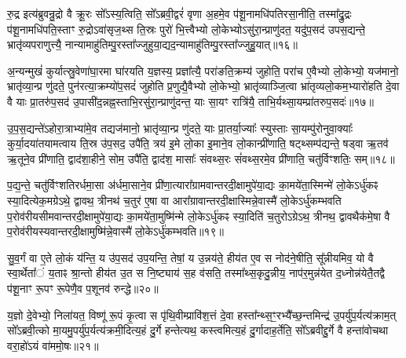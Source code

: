 रु॒द्र इत्य॑ब्रुवन्रु॒द्रो वै क्रू॒रः सो᳚\-ऽस्य॒त्विति॒ सो᳚\-ऽब्रवी॒द्वरं॑ वृणा अ॒हमे॒व प॑शू॒नामधि॑पतिरसा॒नीति॒ तस्मा᳚द्रु॒द्रः प॑शू॒नामधि॑पति॒स्ताꣳ रु॒द्रो\-ऽवा॑सृज॒थ्स ति॒स्रः पुरो॑ भि॒त्त्वैभ्यो लो॒केभ्यो\-ऽसु॑रा॒न्प्राणु॑दत॒ यदु॑प॒सद॑ उपस॒द्यन्ते॒ भ्रातृ॑व्यपराणुत्त्यै॒ नान्यामाहु॑तिम्पु॒रस्ता᳚ज्जुहुया॒द्यद॒न्यामाहु॑तिम्पु॒रस्ता᳚ज्जुहु॒यात्॥१६॥

अ॒न्यन्मुखं॑ कुर्यात्स्रु॒वेणा॑घा॒रमा घा॑रयति य॒ज्ञस्य॒ प्रज्ञा᳚त्यै॒ परा॑ङति॒क्रम्य॑ जुहोति॒ परा॑च ए॒वैभ्यो लो॒केभ्यो॒ यज॑मानो॒ भ्रातृ॑व्या॒न्प्र णु॑दते॒ पुन॑रत्या॒क्रम्यो॑प॒सदं॑ जुहोति प्र॒णुद्यै॒वैभ्यो लो॒केभ्यो॒ भ्रातृ॑व्याञ्जि॒त्वा भ्रा॑तृव्यलो॒कम॒भ्यारो॑हति दे॒वा वै याः प्रा॒तरु॑प॒सद॑ उ॒पासी॑द॒न्नह्न॒स्ताभि॒रसु॑रा॒न्प्राणु॑दन्त॒ याः सा॒यꣳ रात्रि॑यै॒ ताभि॒र्यथ्सा॒यम्प्रा॑तरुप॒सदः॑॥१७॥

उ॒प॒स॒द्यन्ते॑\-ऽहोरा॒त्राभ्या॑मे॒व तद्यज॑मानो॒ भ्रातृ॑व्या॒न्प्र णु॑दते॒ याः प्रा॒तर्या॒ज्याः᳚ स्युस्ताः सा॒यम्पु॑रोनुवा॒क्याः᳚ कुर्या॒दया॑तयामत्वाय ति॒स्र उ॑प॒सद॒ उपै॑ति॒ त्रय॑ इ॒मे लो॒का इ॒माने॒व लो॒कान्प्री॑णाति॒ षट्थ्सम्प॑द्यन्ते॒ षड्वा ऋ॒तव॑ ऋ॒तूने॒व प्री॑णाति॒ द्वाद॑शा॒हीने॒ सोम॒ उपै॑ति॒ द्वाद॑श॒ मासाः᳚ संवथ्स॒रः सं॑वथ्स॒रमे॒व प्री॑णाति॒ चतु॑र्विꣳशतिः॒ सम्॥१८॥

प॒द्य॒न्ते॒ चतु॑र्विꣳशतिरर्धमा॒सा अ॑र्धमा॒साने॒व प्री॑णा॒त्यारा᳚ग्रामवान्तरदी॒क्षामुपे॑या॒द्यः का॒मये॑ता॒स्मिन्मे॑ लो॒के\-ऽर्धु॑कꣴ स्या॒दित्येक॒मग्रे\-ऽथे॒ द्वावथ॒ त्रीनथ॑ च॒तुर॑ ए॒षा वा आरा᳚ग्रावान्तरदी॒क्षास्मिन्ने॒वास्मै॑ लो॒के\-ऽर्धु॑कम्भवति प॒रोव॑रीयसीमवान्तरदी॒क्षामुपे॑या॒द्यः का॒मये॑ता॒मुष्मि॑न्मे लो॒के\-ऽर्धु॑कꣴ स्या॒दिति॑ च॒तुरो\-ऽग्रे\-ऽथ॒ त्रीनथ॒ द्वावथैक॑मे॒षा वै प॒रोव॑रीयस्यवान्तरदी॒क्षामुष्मि॑न्ने॒वास्मै॑ लो॒के\-ऽर्धु॑कम्भवति॥१९॥

{\anuvakamend[{अ॒सि॒ष्य॒तीति॑ जुहु॒याथ्सा॒यम्प्रा॑तरुप॒सद॒श्चतु॑र्विꣳशतिः॒ सञ्च॒तुरो\-ऽग्रे॒ षोड॑श च॥३॥}]}

सु॒व॒र्गं वा ए॒ते लो॒कं य॑न्ति॒ य उ॑प॒सद॑ उप॒यन्ति॒ तेषां॒ य उ॒न्नय॑ते॒ हीय॑त ए॒व स नोद॑ने॒षीति॒ सू᳚न्नीयमिव॒ यो वै स्वा॒र्थेता᳚ं य॒ताꣴ श्रा॒न्तो हीय॑त उ॒त स नि॒ष्ट्याय॑ स॒ह व॑सति॒ तस्मा᳚थ्स॒कृदु॒न्नीय॒ नाप॑र॒मुन्न॑येत द॒ध्नोन्न॑येतै॒तद्वै प॑शू॒नाꣳ रू॒पꣳ रू॒पेणै॒व प॒शूनव॑ रुन्द्धे॥२०॥

य॒ज्ञो दे॒वेभ्यो॒ निला॑यत॒ विष्णू॑ रू॒पं कृ॒त्वा स पृ॑थि॒वीम्प्रावि॑श॒त्तं दे॒वा हस्ता᳚न्थ्स॒ꣳ॒रभ्यै᳚च्छ॒न्तमिन्द्र॑ उ॒पर्यु॑प॒र्यत्य॑क्राम॒त् सो᳚\-ऽब्रवी॒त्को मा॒यमु॒पर्यु॑प॒र्यत्य॑क्रमी॒दित्य॒हं दु॒र्गे हन्तेत्यथ॒ कस्त्वमित्य॒हं दु॒र्गादाह॒र्तेति॒ सो᳚\-ऽब्रवीद्दु॒र्गे वै हन्ता॑वोचथा वरा॒हो॑\-ऽयं वा॑ममो॒षः॥२१॥

